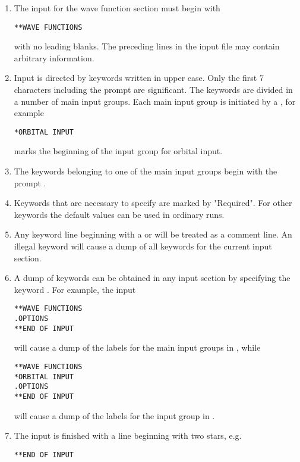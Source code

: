 \begin{enumerate}
\item {The input for the wave function section must begin with

\begin{inputex} \begin{verbatim}
**WAVE FUNCTIONS
\end{verbatim} \end{inputex}
   with no leading blanks.  The preceding lines in the input file may
   contain arbitrary information.
}
\item{ Input is directed by keywords written in upper case.
   Only the first 7 characters including the prompt are significant.
   The keywords are divided in a number of main input groups. Each main
   input group is initiated by a {\starkey}, for example

\begin{inputex} \begin{verbatim}
*ORBITAL INPUT
\end{verbatim} \end{inputex}
   marks the beginning of the input group for orbital input.
}
\item { The keywords belonging to one of the main input groups begin with
   the prompt {\dotkey}.
}
\item { Keywords that are necessary to specify are marked by "Required".
   For other keywords the default values can be used in ordinary runs.
}
\item {Any keyword line beginning with a \quotekw{!} or
   \quotekw{\#} will be treated as a
   comment line.  An illegal keyword will cause a dump of all keywords
   for the current input section.
}
\item{A dump of keywords can be obtained in any input section by
specifying the keyword .  For example, the input

\begin{inputex} \begin{verbatim}
**WAVE FUNCTIONS
.OPTIONS
**END OF INPUT
\end{verbatim} \end{inputex}
   will cause a dump of the labels for the main input groups in {\sir},
   while

\begin{inputex} \begin{verbatim}
**WAVE FUNCTIONS
*ORBITAL INPUT
.OPTIONS
**END OF INPUT
\end{verbatim} \end{inputex}
   will cause a dump of the labels for the  input group
   in {\sir}.
}
\item{ The {\sir} input is finished with a line beginning with two stars,
   e.g.

\begin{inputex} \begin{verbatim}
**END OF INPUT
\end{verbatim} \end{inputex}
}
\end{enumerate}


